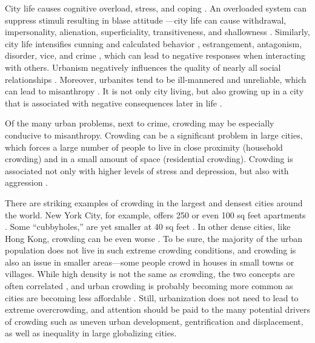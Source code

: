 \documentclass[11pt, letterpaper]{article}
\begin{document}
\begin{spacing}{1.4}
City life causes cognitive overload, stress, and coping \citep{simmel03, milgram70,lederbogen11}. An overloaded system can suppress stimuli resulting in blase attitude
\citep{simmel03}---city life can cause withdrawal, impersonality, alienation, superficiality, transitiveness, and shallowness \citep{wirth38}. Similarly, city life intensifies cunning and calculated behavior \citep{tonnies57}, estrangement, antagonism, disorder, vice, and crime
\citep{milgram70,park15,park84,bettencourt10b}, which can lead to negative 
responses when interacting with others.
%
Urbanism negatively influences the quality of nearly all social relationships
\citep{wilson85}. Moreover, urbanites tend to be ill-mannered and unreliable,
which can lead to misanthropy
\citep[e.g.,][]{aokCityBook15,aok-sizeFetish17}. It is not only city living, but
also growing  up in a city that is  associated with negative consequences later in life \citep{lederbogen11,aok20}.

%
Of the many urban problems, next to crime, crowding may be especially conducive to
misanthropy.  
Crowding can be a significant problem in large cities, which forces a large number of people to live in close proximity (household crowding) and in a small amount of space (residential crowding). Crowding is associated not only with higher levels of stress and depression, but also with aggression \citep{regoeczi2008,calhoun62}. 

There are striking examples of crowding in the largest and densest cities around
the world. New York City, for example, offers 250 or even 100 sq feet apartments
\citep{abc,yoneda,dailynews}. Some ``cubbyholes,'' are yet smaller at 40 sq feet \citep{newyorktimes}. In other dense cities, like Hong Kong, crowding can be even worse \citep{newyorktimes2}. To
  be sure, the majority of the urban population does not live in such extreme crowding conditions, and crowding is also an issue in smaller areas---some people crowd in houses in small towns or villages.
  While high density is not the same as crowding, the two concepts are often
  correlated \citep{meyer13}, and urban crowding is probably becoming more
  common  as cities are becoming less affordable  \citep[e.g.,][]{misraCL15oct6,floridaCL18apr11,weinbergCL16aug11,solariMISC19apr24,schuetzMISC19may7,kotkin_db_mar20_13}. 
%    
 Still, urbanization does not need to lead to extreme overcrowding, and attention should be
 paid to the many potential drivers of crowding such as  uneven urban
  development, gentrification and displacement, as well as inequality in large
  globalizing cities. 


\end{spacing}
\end{document}

